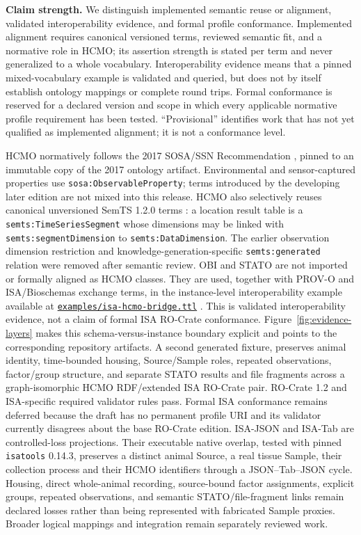 \textbf{Claim strength.} We distinguish implemented semantic reuse or alignment, validated interoperability evidence, and formal profile conformance. Implemented alignment requires canonical versioned terms, reviewed semantic fit, and a normative role in HCMO; its assertion strength is stated per term and never generalized to a whole vocabulary. Interoperability evidence means that a pinned mixed-vocabulary example is validated and queried, but does not by itself establish ontology mappings or complete round trips. Formal conformance is reserved for a declared version and scope in which every applicable normative profile requirement has been tested. ``Provisional'' identifies work that has not yet qualified as implemented alignment; it is not a conformance level.

HCMO normatively follows the 2017 SOSA/SSN Recommendation \cite{sosa}, pinned to an immutable copy of the 2017 ontology artifact. Environmental and sensor-captured properties use \nolinkurl{sosa:ObservableProperty}; terms introduced by the developing later edition are not mixed into this release. HCMO also selectively reuses canonical unversioned SemTS 1.2.0 terms \cite{semts}: a location result table is a \nolinkurl{semts:TimeSeriesSegment} whose dimensions may be linked with \nolinkurl{semts:segmentDimension} to \nolinkurl{semts:DataDimension}. The earlier observation dimension restriction and knowledge-generation-specific \nolinkurl{semts:generated} relation were removed after semantic review. OBI and STATO are not imported or formally aligned as HCMO classes. They are used, together with PROV-O and ISA/Bioschemas exchange terms, in the instance-level interoperability example available at \href{https://github.com/dhuzard/HCMO/blob/v0.3.0/examples/isa-hcmo-bridge.ttl}{\texttt{examples/isa-hcmo-bridge.ttl}} \cite{isa,rocrate}. This is validated interoperability evidence, not a claim of formal ISA RO-Crate conformance. Figure~\ref{fig:evidence-layers} makes this schema-versus-instance boundary explicit and points to the corresponding repository artifacts. A second generated fixture,  preserves animal identity, time-bounded housing, Source/Sample roles, repeated observations, factor/group structure, and separate STATO results and file fragments across a graph-isomorphic HCMO RDF/extended ISA RO-Crate pair. RO-Crate 1.2 and ISA-specific required validator rules pass. Formal ISA conformance remains deferred because the draft has no permanent profile URI and its validator currently disagrees about the base RO-Crate edition. ISA-JSON and ISA-Tab are controlled-loss projections. Their executable native overlap, tested with pinned \nolinkurl{isatools} 0.14.3, preserves a distinct animal Source, a real tissue Sample, their collection process and their HCMO identifiers through a JSON--Tab--JSON cycle. Housing, direct whole-animal recording, source-bound factor assignments, explicit groups, repeated observations, and semantic STATO/file-fragment links remain declared losses rather than being represented with fabricated Sample proxies. Broader logical mappings and integration remain separately reviewed work.

